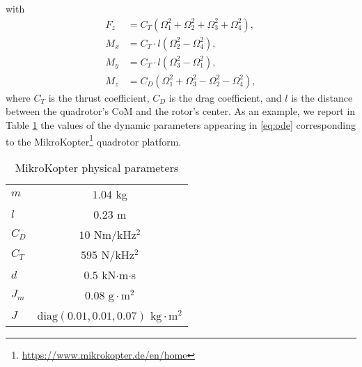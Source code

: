  with
 \begin{subequations}
 \begin{align}
 	F_z &= C_T(\Omega_{1}^{2}+\Omega_{2}^{2}+\Omega_{3}^{2}+\Omega_{4}^{2}),\label{eq:total_thrust}\\
 	M_x & = C_T\cdot l(\Omega_{2}^{2}-\Omega_{4}^{2}),\\
    M_y &= C_T\cdot l(\Omega_{3}^{2}-\Omega_{1}^{2}), \\
    M_z & = C_D(\Omega_{1}^{2}+\Omega_{3}^{2}-\Omega_{2}^{2}-\Omega_{4}^{2}),
 \end{align}
 \end{subequations}
where $C_T$ is the thrust coefficient, $C_D$ is the drag coefficient, and $l$ is the distance between the quadrotor's CoM and the rotor's center. As an example, we report  in Table \ref{tab:prm} the values of the  dynamic parameters appearing in \eqref{eq:ode} corresponding to the MikroKopter\footnote{\url{https://www.mikrokopter.de/en/home}} quadrotor platform.

\begin{table}[b]
\caption{MikroKopter physical parameters}
\centering
\begin{tabular}{lc}
\toprule
$m$ 	& $1.04$ kg \\
$l$ 	& $0.23$ m \\
$C_D$ 	& $10$ Nm/kHz$^2$ \\
$C_T$ 	& $595$ N/kHz$^2$ \\
$d$ 	& $0.5$ kN${\cdot}$m${\cdot}$s \\
$J_m$ 	& $0.08$ $\text{g}{\cdot}\text{m}^2$ \\
$J$ 	& $\text{diag}(0.01,0.01,0.07)$ $\text{kg}{\cdot}\text{m}^2$\\
\bottomrule
\end{tabular}\label{tab:prm}
\end{table}